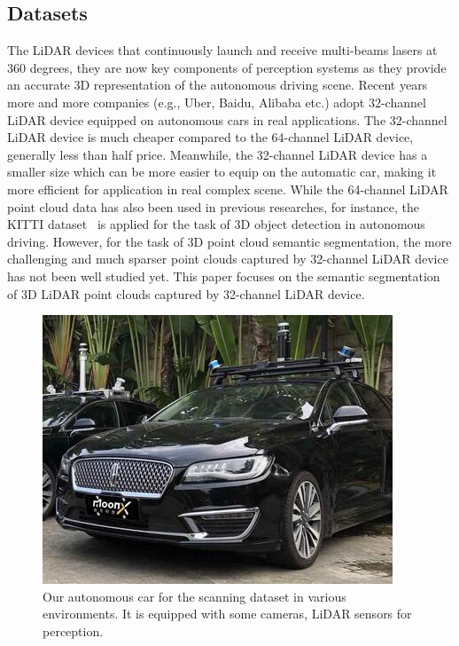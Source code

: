 \documentclass{sip}%
\begin{document}
\subsection{Datasets}
The LiDAR devices that continuously launch and receive multi-beams lasers at 360 degrees, they are now key components of perception systems as they provide an accurate 3D representation of the autonomous driving scene.
Recent years more and more companies (e.g., Uber, Baidu, Alibaba etc.) adopt 32-channel LiDAR device equipped on autonomous cars in real applications.
The 32-channel LiDAR device is much cheaper compared to the 64-channel LiDAR device, generally less than half price.
Meanwhile, the 32-channel LiDAR device has a smaller size which can be more easier to equip on the automatic car, making it more efficient for application in real complex scene.
While the 64-channel LiDAR point cloud data has also been used in previous researches, for instance, the KITTI dataset~\cite{geiger2012we} is applied for the task of 3D object detection in autonomous driving. 
However, for the task of 3D point cloud semantic segmentation, the more challenging and much sparser point clouds captured by 32-channel LiDAR device has not been well studied yet.
This paper focuses on the semantic segmentation of 3D LiDAR point clouds captured by 32-channel LiDAR device.
\begin{figure}[H]
    \centering
    \includegraphics[width=0.9\columnwidth]{car1.jpg}
    \caption{Our autonomous car for the scanning dataset in various environments. It is equipped with some cameras, LiDAR sensors for perception. }
    \label{fig:teas}
\end{figure}
\end{document}
